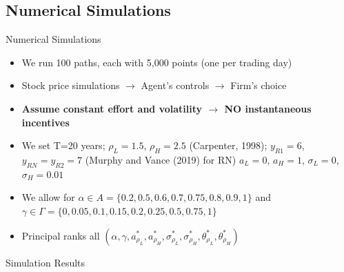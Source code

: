 \documentclass{beamer}
\begin{document}
\subsection{Numerical Simulations}
\begin{frame}{Numerical Simulations}
    \begin{itemize}
        \item We run 100 paths, each with 5,000 points (one per trading day)
        \item Stock price simulations $\rightarrow$ Agent's controls $\rightarrow$ Firm's choice
        \item \textbf{Assume constant effort and volatility $\rightarrow$ NO instantaneous incentives}
        \item We set T=20 years; $\rho_L = 1.5$, $\rho_H = 2.5$ (Carpenter, 1998); $y_{R1} = 6$, $y_{RN} = y_{R2} = 7$ (Murphy and Vance (2019) for RN) $a_L = 0$, $a_H = 1$, $\sigma_L = 0$, $\sigma_H = 0.01$
        \item We allow for $\alpha \in A = \{0.2, 0.5, 0.6, 0.7, 0.75, 0.8, 0.9, 1\}$ and $\gamma \in \Gamma = \{0, 0.05, 0.1, 0.15, 0.2, 0.25, 0.5, 0.75, 1\}$
        \item Principal ranks all $(\alpha, \gamma, a^*_{\rho_L}, a^*_{\rho_H}, \sigma^*_{\rho_L}, \sigma^*_{\rho_H}, \theta^*_{\rho_L}, \theta^*_{\rho_H})$
    \end{itemize}
\end{frame}


\begin{frame}{Simulation Results}
\end{frame}
\end{document}
